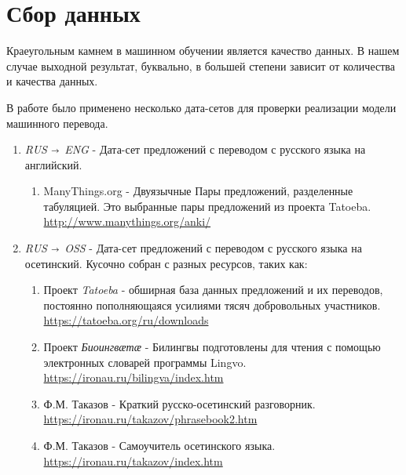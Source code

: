 	\section{Сбор данных}
	
	Краеугольным камнем в машинном обучении является качество данных. В нашем случае выходной результат, буквально, в большей степени зависит от количества и качества данных.
	
	В работе было применено несколько дата-сетов для проверки реализации модели машинного перевода.
	
	\begin{enumerate}
		\item \textit{RUS $\shortrightarrow$ ENG} - Дата-сет предложений с переводом с русского языка на английский.
		\begin{enumerate}
			\item ManyThings.org - Двуязычные Пары предложений, разделенные табуляцией. 
			Это выбранные пары предложений из проекта Tatoeba. \\ 
			\url{http://www.manythings.org/anki/}
		\end{enumerate}
		\item \textit{RUS $\shortrightarrow$ OSS} - Дата-сет предложений с переводом с русского языка на осетинский.
		Кусочно собран с разных ресурсов, таких как:
		\begin{enumerate}
			 \item Проект \textit{Tatoeba} - обширная база данных предложений и их переводов, постоянно пополняющаяся усилиями тясяч добровольных участников. \\ \url{https://tatoeba.org/ru/downloads}
			 \item Проект \textit{Биоингвӕтӕ} - Билингвы подготовлены для чтения с помощью электронных словарей программы Lingvo. \\ \url{https://ironau.ru/bilingva/index.htm}
			 \item Ф.М. Таказов - Краткий русско-осетинский разговорник. \\ \url{https://ironau.ru/takazov/phrasebook2.htm}
			 \item Ф.М. Таказов - Самоучитель осетинского языка. \\ \url{https://ironau.ru/takazov/index.htm}
 		\end{enumerate}
	\end{enumerate}

    \newpage

	
